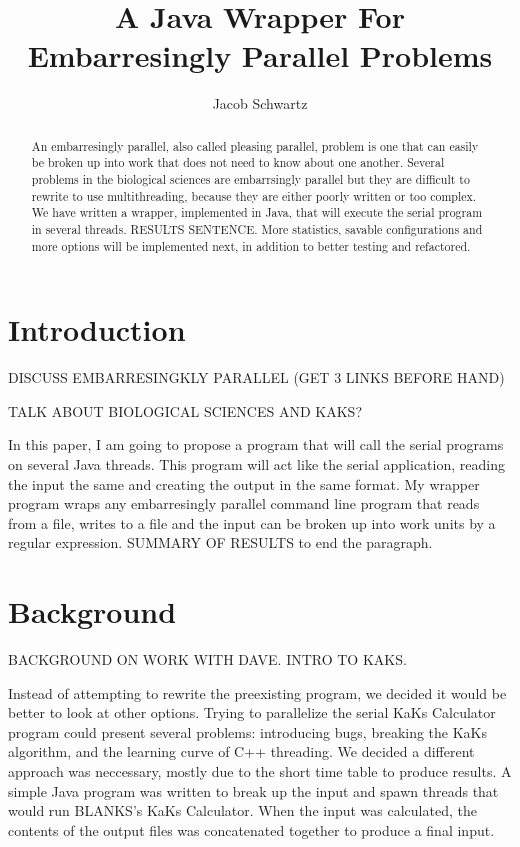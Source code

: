 \documentclass[12pt]{article}
\begin{document}
\title{A Java Wrapper For Embarresingly Parallel Problems}
\author{Jacob Schwartz}
\maketitle

\begin{abstract}
An embarresingly parallel, also called pleasing parallel, problem is one that 
can easily be broken up into work that does not need to know about one another.
Several problems in the biological sciences are embarrsingly parallel but they
are difficult to rewrite to use multithreading, because they are either poorly
written or too complex. We have written a wrapper, implemented in Java, that
will execute the serial program in several threads. RESULTS SENTENCE. More
statistics, savable configurations and more options will be implemented next, in
addition to better testing and refactored.
\end{abstract}

\section{Introduction}

DISCUSS EMBARRESINGKLY PARALLEL (GET 3 LINKS BEFORE HAND)

TALK ABOUT BIOLOGICAL SCIENCES AND KAKS?

In this paper, I am going to propose a program that will call the serial
programs on several Java threads. This program will act like the serial
application, reading the input the same and creating the output in the same
format. My wrapper program wraps any embarresingly parallel command line program
that reads from a file, writes to a file and the input can be broken up into
work units by a regular expression. SUMMARY OF RESULTS to end the paragraph.

\section{Background}

BACKGROUND ON WORK WITH DAVE. INTRO TO KAKS.

Instead of attempting to rewrite the preexisting program, we decided it would be
better to look at other options. Trying to parallelize the serial KaKs 
Calculator program could present several problems: introducing bugs, breaking 
the KaKs algorithm, and the learning curve of C++ threading. We decided a 
different approach was neccessary, mostly due to the short time table to produce
results. A simple Java program was written to break up the input and spawn 
threads that would run BLANKS's KaKs Calculator\cite{blah}. When the input was 
calculated, the contents of the output files was concatenated together 
to produce a final input. 
\end{document}
